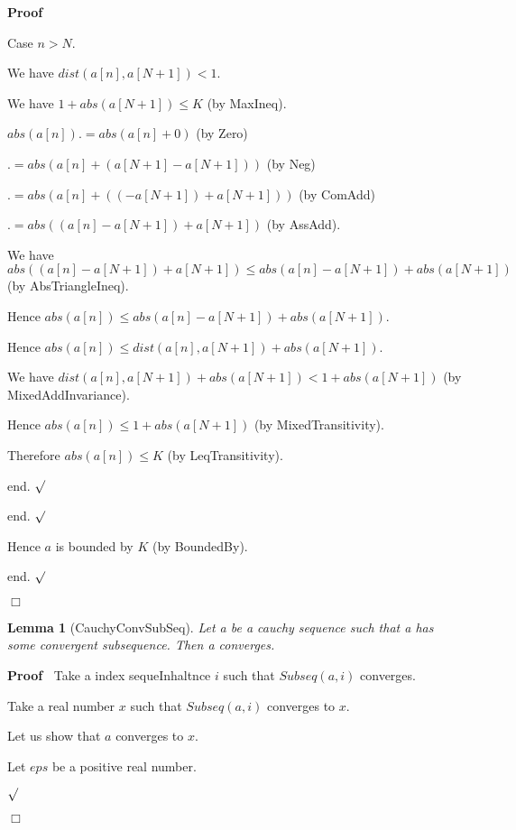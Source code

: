 \documentclass{article}
\newenvironment{forthel}{\begin{leftbar}}{\end{leftbar}}
\newenvironment{proof}{\noindent\textbf{Proof\ }}{\hspace*{\fill}$\Box$\medskip}
\newenvironment{subproof}{\begin{list}{}{}
		\item[\text{Proof}]}{\hfill $\surd$ \end{list}}
\newtheorem{lemma}{Lemma}
\begin{document}
\begin{forthel}
\begin{proof}
\begin{subproof}
\begin{subproof}
				Case $n > N$.
				
				\begin{subproof}
					We have $dist(a[n],a[N + 1]) < 1$.
					
					We have $1 + abs(a[N + 1]) \leq K$ (by MaxIneq).
					
					$abs(a[n]) .= abs(a[n] + 0)$ (by Zero)
					
					$.= abs(a[n] + (a[N + 1] - a[N + 1]))$ (by Neg)
					
					$.= abs(a[n] + ((-a[N + 1]) + a[N + 1]))$ (by ComAdd)
					
					$.= abs((a[n] - a[N + 1]) + a[N + 1])$ (by AssAdd).
					
					We have $abs((a[n] - a[N + 1]) + a[N + 1]) \leq abs(a[n] - a[N + 1]) + abs(a[N + 1])$ (by AbsTriangleIneq).
					
					Hence $abs(a[n]) \leq abs(a[n] - a[N + 1]) + abs(a[N + 1])$.
					
					Hence $abs(a[n]) \leq dist(a[n],a[N + 1]) + abs(a[N + 1])$.
					
					We have $dist(a[n],a[N + 1]) + abs(a[N + 1]) < 1 + abs(a[N + 1])$ (by MixedAddInvariance).
					
					Hence $abs(a[n]) \leq 1 + abs(a[N + 1])$ (by MixedTransitivity).
					
					Therefore $abs(a[n]) \leq K$ (by LeqTransitivity).
					
					end.
				\end{subproof}
				
				end.					
			\end{subproof}
			
			Hence $a$ is bounded by $K$ (by BoundedBy).		
			
			end.
		\end{subproof}
	\end{proof}
	
	\begin{lemma}[CauchyConvSubSeq]
		Let a be a cauchy sequence such that a has some convergent subsequence. Then a converges.
	\end{lemma}
	
	\begin{proof}
		Take a index sequeInhaltnce $i$ such that $Subseq(a,i)$ converges.
		
		Take a real number $x$ such that $Subseq(a,i)$ converges to $x$.
		
		Let us show that $a$ converges to $x$.
		
		\begin{subproof}
			Let $eps$ be a positive real number.
			

\end{subproof}
\end{proof}
\end{forthel}
\end{document}

